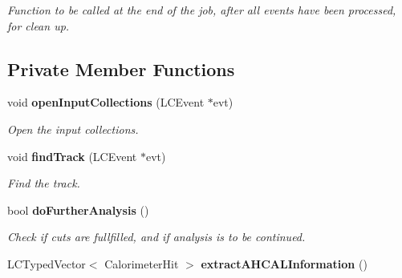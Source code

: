\begin{DoxyCompactItemize}
\begin{DoxyCompactList}\small\item\em Function to be called at the end of the job, after all events have been processed, for clean up. \item\end{DoxyCompactList}\end{DoxyCompactItemize}
\subsection*{Private Member Functions}
\begin{DoxyCompactItemize}
\item 
void {\bf openInputCollections} (LCEvent $\ast$evt)
\begin{DoxyCompactList}\small\item\em Open the input collections. \item\end{DoxyCompactList}\item 
void {\bf findTrack} (LCEvent $\ast$evt)
\begin{DoxyCompactList}\small\item\em Find the track. \item\end{DoxyCompactList}\item 
bool {\bf doFurtherAnalysis} ()
\begin{DoxyCompactList}\small\item\em Check if cuts are fullfilled, and if analysis is to be continued. \item\end{DoxyCompactList}\item 
LCTypedVector$<$ CalorimeterHit $>$ {\bf extractAHCALInformation} ()\label{classCALICE_1_1MipTrackFinder_a7f4716ef4bc5a11b189878d76b967d8f}


\end{DoxyCompactItemize}
